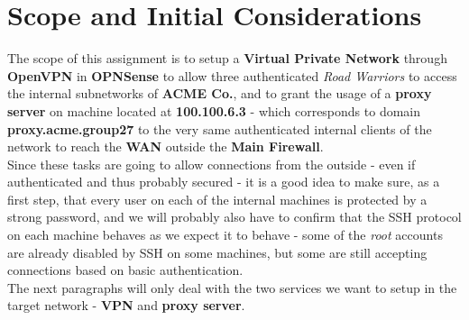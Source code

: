 \section{Scope and Initial Considerations}
The scope of this assignment is to setup a \textbf{Virtual Private Network} through \textbf{OpenVPN} in \textbf{OPNSense} to allow three authenticated \textit{Road Warriors} to access the internal subnetworks of \textbf{ACME Co.}, and to grant the usage of a \textbf{proxy server} on machine located at \textbf{100.100.6.3} -  which corresponds to domain \textbf{proxy.acme.group27} to the very same authenticated internal clients of the network to reach the \textbf{WAN} outside the \textbf{Main Firewall}.\\
Since these tasks are going to allow connections from the outside - even if authenticated and thus probably secured - it is a good idea to make sure, as a first step, that every user on each of the internal machines is protected by a strong password, and we will probably also have to confirm that the SSH protocol on each machine behaves as we expect it to behave - some of the \textit{root} accounts are already disabled by SSH on some machines, but some are still accepting connections based on basic authentication.\\
The next paragraphs will only deal with the two services we want to setup in the target network - \textbf{VPN} and \textbf{proxy server}.
